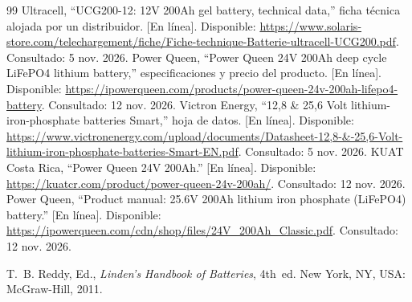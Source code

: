 \begin{thebibliography}{99}
 Ultracell, ``UCG200-12: 12V 200Ah gel battery, technical data,'' ficha técnica alojada por un distribuidor. [En línea]. Disponible: \url{https://www.solaris-store.com/telechargement/fiche/Fiche-technique-Batterie-ultracell-UCG200.pdf}. Consultado: 5 nov. 2026.
 Power Queen, ``Power Queen 24V 200Ah deep cycle LiFePO4 lithium battery,'' especificaciones y precio del producto. [En línea]. Disponible: \url{https://ipowerqueen.com/products/power-queen-24v-200ah-lifepo4-battery}. Consultado: 12 nov. 2026.
 Victron Energy, ``12,8 \& 25,6 Volt lithium-iron-phosphate batteries Smart,'' hoja de datos. [En línea]. Disponible: \url{https://www.victronenergy.com/upload/documents/Datasheet-12,8-&-25,6-Volt-lithium-iron-phosphate-batteries-Smart-EN.pdf}. Consultado: 5 nov. 2026.
 KUAT Costa Rica, ``Power Queen 24V 200Ah.'' [En línea]. Disponible: \url{https://kuatcr.com/product/power-queen-24v-200ah/}. Consultado: 12 nov. 2026.
 Power Queen, ``Product manual: 25.6V 200Ah lithium iron phosphate (LiFePO4) battery.'' [En línea]. Disponible: \url{https://ipowerqueen.com/cdn/shop/files/24V_200Ah_Classic.pdf}. Consultado: 12 nov. 2026.

 T.~B. Reddy, Ed., \emph{Linden's Handbook of Batteries}, 4th~ed. New York, NY, USA: McGraw-Hill, 2011.


\end{thebibliography}
